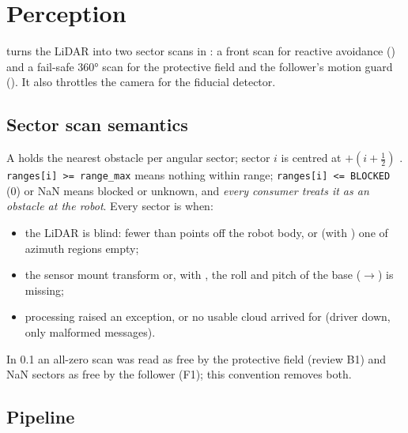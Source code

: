 \chapter{Perception}
\label{ch:perception}

 turns the LiDAR into two sector scans in : a
front scan for reactive avoidance () and a fail-safe 360° scan for
the protective field and the follower's motion guard (). It also
throttles the camera for the fiducial detector.

\section{Sector scan semantics}

A  holds the nearest obstacle per angular sector; sector $i$ is centred at
 $+ (i + \tfrac12)$ . \texttt{ranges[i] >= range\_max} means
nothing within range; \texttt{ranges[i] <= BLOCKED} (0) or NaN means blocked or unknown, and
\emph{every consumer treats it as an obstacle at the robot}. Every sector is 
when:
\begin{itemize}
  \item the LiDAR is blind: fewer than  points off the robot body, or
    (with ) one of  azimuth regions empty;
  \item the sensor mount transform or, with  , the roll and
    pitch of the base ($\to$) is missing;
  \item processing raised an exception, or no usable cloud arrived for
     (driver down, only malformed messages).
\end{itemize}
In 0.1 an all-zero scan was read as free by the protective field (review B1) and NaN sectors as
free by the follower (F1); this convention removes both.

\section{Pipeline}

